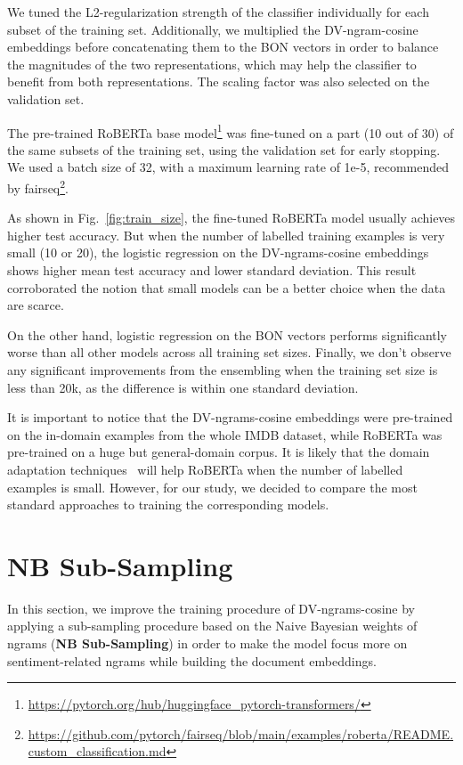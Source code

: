 \documentclass[11pt]{article}
\begin{document}
We tuned the L2-regularization strength  of the classifier individually for each subset of the training set. Additionally, we multiplied the DV-ngram-cosine embeddings before concatenating them to the BON vectors in order to balance the magnitudes of the two representations, which may help the classifier to benefit from both representations. The scaling factor was also selected on the validation set. 

The pre-trained RoBERTa base model\footnote{\url{https://pytorch.org/hub/huggingface_pytorch-transformers/}} was fine-tuned on a part (10 out of 30) of the same subsets of the training set, using the validation set for early stopping. We used a batch size of 32, with a maximum learning rate of 1e-5, recommended by fairseq\footnote{\url{https://github.com/pytorch/fairseq/blob/main/examples/roberta/README.custom_classification.md}}. 


As shown in Fig.~\ref{fig:train_size}, the fine-tuned RoBERTa model usually achieves higher test accuracy. But when the number of labelled training examples is very small (10 or 20), the logistic regression on the DV-ngrams-cosine embeddings shows higher mean test accuracy and lower standard deviation. This result corroborated the notion that small models can be a better choice when the data are scarce.

On the other hand, logistic regression on the BON vectors performs significantly worse than all other models across all training set sizes. Finally, we don't observe any significant improvements from the ensembling when the training set size is less than 20k, as the difference is within one standard deviation.

It is important to notice that the DV-ngrams-cosine embeddings were pre-trained on the in-domain examples from the whole IMDB dataset, while RoBERTa was pre-trained on a huge but general-domain corpus.
It is likely that the domain adaptation techniques~\cite{suchin2020} will help RoBERTa when the number of labelled examples is small. However, for our study, we decided to compare the most standard approaches to training the corresponding models.

\section{NB Sub-Sampling}
\label{sec:subsamp}
In this section, we improve the training procedure of DV-ngrams-cosine by applying a sub-sampling procedure based on the Naive Bayesian weights of ngrams (\textbf{NB Sub-Sampling}) in order to make the model focus more on sentiment-related ngrams while building the document embeddings.
\end{document}
